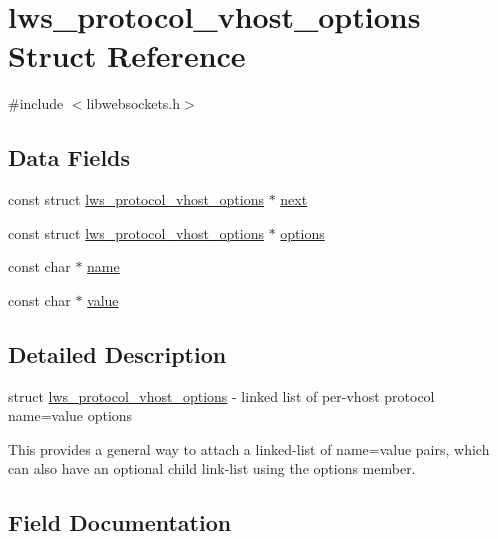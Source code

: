 \hypertarget{structlws__protocol__vhost__options}{}\section{lws\+\_\+protocol\+\_\+vhost\+\_\+options Struct Reference}
\label{structlws__protocol__vhost__options}


{\ttfamily \#include $<$libwebsockets.\+h$>$}

\subsection*{Data Fields}
\begin{DoxyCompactItemize}
\item 
const struct \hyperlink{structlws__protocol__vhost__options}{lws\+\_\+protocol\+\_\+vhost\+\_\+options} $\ast$ \hyperlink{structlws__protocol__vhost__options_abc714ddb4171756fc8196e9823a1e21c}{next}
\item 
const struct \hyperlink{structlws__protocol__vhost__options}{lws\+\_\+protocol\+\_\+vhost\+\_\+options} $\ast$ \hyperlink{structlws__protocol__vhost__options_afd99fbc90be51ea2465b550c2ec47822}{options}
\item 
const char $\ast$ \hyperlink{structlws__protocol__vhost__options_acf9db77f8eb64cd4e314be9b43d8a8b9}{name}
\item 
const char $\ast$ \hyperlink{structlws__protocol__vhost__options_a0640a92513c70ee6b9b295a9ad1658e7}{value}
\end{DoxyCompactItemize}


\subsection{Detailed Description}
struct \hyperlink{structlws__protocol__vhost__options}{lws\+\_\+protocol\+\_\+vhost\+\_\+options} -\/ linked list of per-\/vhost protocol name=value options

This provides a general way to attach a linked-\/list of name=value pairs, which can also have an optional child link-\/list using the options member. 

\subsection{Field Documentation}
